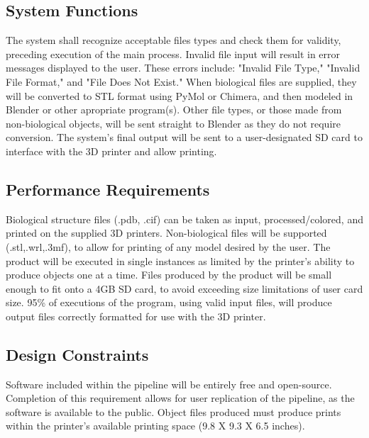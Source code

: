 \documentclass[letterpaper, onecolumn, draftclsnofoot, 10pt, compsoc]{IEEEtran}
\begin{document}
    \subsection{System Functions}
    The system shall recognize acceptable files types and check them for validity, preceding execution of the main process.
    Invalid file input will result in error messages displayed to the user.
    These errors include: "Invalid File Type," "Invalid File Format," and "File Does Not Exist."
    When biological files are supplied, they will be converted to STL format using PyMol or Chimera, and then modeled in Blender or other apropriate program(s). 
    Other file types, or those made from non-biological objects, will be sent straight to Blender as they do not require conversion.
    The system's final output will be sent to a user-designated SD card to interface with the 3D printer and allow printing.
    
    \subsection{Performance Requirements}
    Biological structure files (.pdb, .cif) can be taken as input, processed/colored, and printed on the supplied 3D printers.
	Non-biological files will be supported (.stl,.wrl,.3mf), to allow for printing of any model desired by the user.
    The product will be executed in single instances as limited by the printer's ability to produce objects one at a time.
    Files produced by the product will be small enough to fit onto a 4GB SD card, to avoid exceeding size limitations of user card size.
    95\% of executions of the program, using valid input files, will produce output files correctly formatted for use with the 3D printer.
    
    \subsection{Design Constraints}
    Software included within the pipeline will be entirely free and open-source. 
    Completion of this requirement allows for user replication of the pipeline, as the software is available to the public.
    Object files produced must produce prints within the printer's available printing space (9.8 X 9.3 X 6.5 inches).
    
\end{document}
